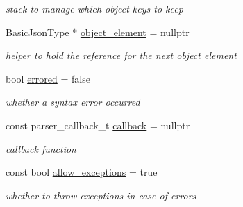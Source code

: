 \begin{DoxyCompactItemize}
\begin{DoxyCompactList}\small\item\em stack to manage which object keys to keep \end{DoxyCompactList}\item 
\mbox{\label{classnlohmann_1_1detail_1_1json__sax__dom__callback__parser_a2a8adecd936ba6ec187f1216241b508f}} 
Basic\+Json\+Type $\ast$ \mbox{\hyperlink{classnlohmann_1_1detail_1_1json__sax__dom__callback__parser_a2a8adecd936ba6ec187f1216241b508f}{object\+\_\+element}} = nullptr
\begin{DoxyCompactList}\small\item\em helper to hold the reference for the next object element \end{DoxyCompactList}\item 
\mbox{\label{classnlohmann_1_1detail_1_1json__sax__dom__callback__parser_ab06baaa640cfaae5846daa7c3594b116}} 
bool \mbox{\hyperlink{classnlohmann_1_1detail_1_1json__sax__dom__callback__parser_ab06baaa640cfaae5846daa7c3594b116}{errored}} = false
\begin{DoxyCompactList}\small\item\em whether a syntax error occurred \end{DoxyCompactList}\item 
\mbox{\label{classnlohmann_1_1detail_1_1json__sax__dom__callback__parser_a46a72dffd5be4a25602af00f0033c126}} 
const parser\+\_\+callback\+\_\+t \mbox{\hyperlink{classnlohmann_1_1detail_1_1json__sax__dom__callback__parser_a46a72dffd5be4a25602af00f0033c126}{callback}} = nullptr
\begin{DoxyCompactList}\small\item\em callback function \end{DoxyCompactList}\item 
\mbox{\label{classnlohmann_1_1detail_1_1json__sax__dom__callback__parser_a0a1390c23e2a3da774d75c050f9b3f13}} 
const bool \mbox{\hyperlink{classnlohmann_1_1detail_1_1json__sax__dom__callback__parser_a0a1390c23e2a3da774d75c050f9b3f13}{allow\+\_\+exceptions}} = true
\begin{DoxyCompactList}\small\item\em whether to throw exceptions in case of errors \end{DoxyCompactList}\item 

\end{DoxyCompactItemize}
